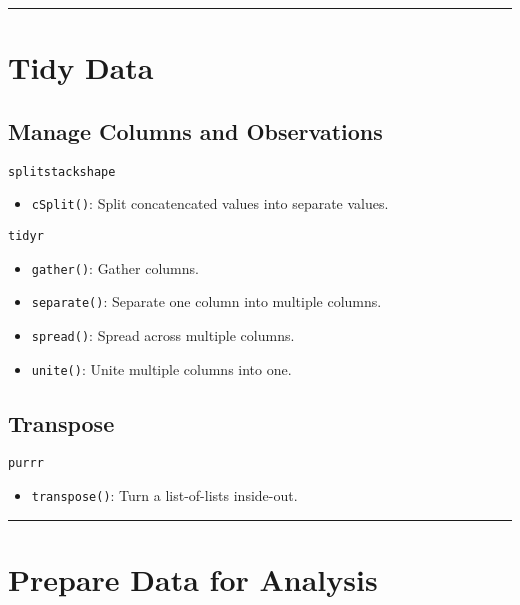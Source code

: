\documentclass[]{book}
\providecommand{\tightlist}{%
  \setlength{\itemsep}{0pt}\setlength{\parskip}{0pt}}
\theoremstyle{definition}
\theoremstyle{definition}
\theoremstyle{definition}
\theoremstyle{remark}
\begin{document}
\begin{center}\rule{0.5\linewidth}{\linethickness}\end{center}

\section{Tidy Data}\label{tidy-data}

\subsection{Manage Columns and
Observations}\label{manage-columns-and-observations}

\texttt{splitstackshape}

\begin{itemize}
\tightlist
\item
  \texttt{cSplit()}: Split concatencated values into separate values.
\end{itemize}

\texttt{tidyr}

\begin{itemize}
\tightlist
\item
  \texttt{gather()}: Gather columns.
\item
  \texttt{separate()}: Separate one column into multiple columns.
\item
  \texttt{spread()}: Spread across multiple columns.
\item
  \texttt{unite()}: Unite multiple columns into one.
\end{itemize}

\subsection{Transpose}\label{transpose}

\texttt{purrr}

\begin{itemize}
\tightlist
\item
  \texttt{transpose()}: Turn a list-of-lists inside-out.
\end{itemize}

\begin{center}\rule{0.5\linewidth}{\linethickness}\end{center}

\section{Prepare Data for Analysis}\label{prepare-data-for-analysis}
\end{document}
